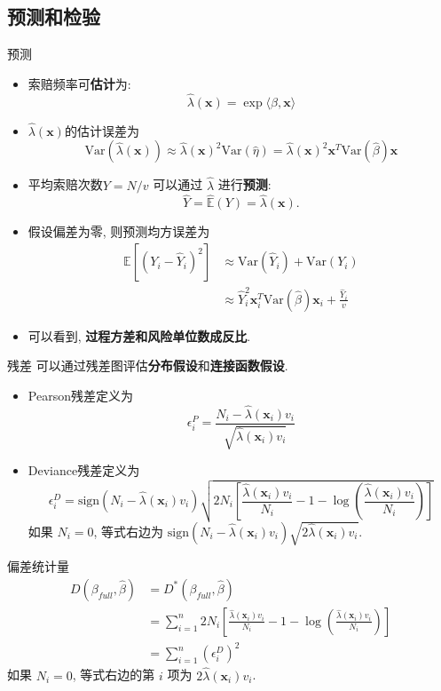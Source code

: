 \documentclass[professionalfont]{beamer}
\def\E{{\mathbb E}}  %
\def\bx{\boldsymbol{x}}
\begin{document}
\subsection{预测和检验}
\begin{frame}{预测}
	\begin{itemize}
		\item 	索赔频率可\textbf{估计}为:$$\hat{\lambda}(\bx)=\exp\langle\hat{\beta},\bx\rangle$$
		\item $\hat{\lambda}(\bx)$的估计误差为
		\begin{equation}\label{estimation_error}
		\text{Var}(\hat{\lambda}(\bx))\approx\hat{\lambda}(\bx)^2\text{Var}(\hat{\eta})=\hat{\lambda}(\bx)^2\bx^T\text{Var}(\hat{\beta})\bx
		\end{equation}
	\item 平均索赔次数$Y=N/v$ 可以通过 $\hat{\lambda}$ 进行\textbf{预测}:$$\hat{Y}=\hat{\E}(Y)=\hat{\lambda}(\bx).$$ 
	\item 假设偏差为零, 则预测均方误差为
	\begin{equation}\label{MSEP2}
	\begin{aligned}
	\E\left[\left(Y_i-\hat{Y}_i\right)^2\right]&\approx\text{Var}(\hat{Y}_i)+\text{Var}(Y_i)\\
	&\approx\hat{Y}_i^2\bx_i^T\text{Var}(\hat{\beta})\bx_i+\frac{\hat{Y}_i}{v}
	\end{aligned}
	\end{equation}
	\item 可以看到, \textbf{过程方差和风险单位数成反比}.
	\end{itemize}
 \end{frame}
\begin{frame}{残差}
	可以通过残差图评估\textbf{分布假设}和\textbf{连接函数假设}.
	\begin{itemize}
	\item	Pearson残差定义为
	$${\epsilon}_i^P=\frac{N_i-\hat{\lambda}(\bx_i)v_i}{\sqrt{\hat{\lambda}(\bx_i)v_i}}$$
	\item Deviance残差定义为
	$${\epsilon}_i^D=\text{sign}\left(N_i-\hat{\lambda}(\bx_i)v_i\right)\sqrt{2N_i\left[\frac{\hat{\lambda}(\bx_i)v_i}{N_i}-1-\log\left(\frac{\hat{\lambda}(\bx_i)v_i}{N_i}\right)\right]}$$
	如果 $N_i=0$, 等式右边为 $\text{sign}\left(N_i-\hat{\lambda}(\bx_i)v_i\right)\sqrt{2\hat{\lambda}(\bx_i)v_i}$.
	\end{itemize}
\end{frame}
\begin{frame}{偏差统计量}
	\begin{equation}
	\begin{aligned}
	D(\beta_{full},\hat{\beta})&=D^*(\beta_{full},\hat{\beta})\\&=\sum_{i=1}^n2N_i\left[\frac{\hat{\lambda}(\bx_i)v_i}{N_i}-1-\log\left(\frac{\hat{\lambda}(\bx_i)v_i}{N_i}\right)\right]\\
	&=\sum_{i=1}^n\left(\epsilon^D_i\right)^2
	\end{aligned}
	\end{equation}
	如果 $N_i=0$, 等式右边的第 $i$ 项为 $2\hat{\lambda}(\bx_i)v_i$.
\end{frame}
\end{document}
